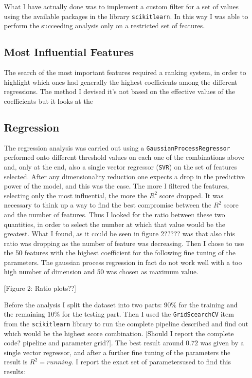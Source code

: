 \documentclass[11pt,a4paper]{report}
\begin{document}
What I have actually done was to implement a custom filter for a set of values using the available packages in the library \texttt{scikitlearn}. In this way I was able to perform the succeeding analysis only on a restricted set of features.

\subsection*{Most Influential Features}
The search of the most important features required a ranking system, in order to highlight which ones had generally the highest coefficients among the different regressions. The method I devised it's not based on the effective values of the coefficients but it looks at the 



\subsection*{Regression}
The regression analysis was carried out using a \texttt{GaussianProcessRegressor} performed onto different threshold values on each one of the combinations above and, only at the end, also a single vector regressor (\texttt{SVR}) on the set of features selected.
After any dimensionality reduction one expects a drop in the predictive power of the model, and this was the case. The more I filtered the features, selecting only the most influential, the more the $R^{2}$ score dropped. It was necessary to think up a way to find the best compromise between the $R^{2}$ score and the number of features. Thus I looked for the ratio between these two quantities, in order to select the number at which that value would be the greatest. What I found, as it could be seen in figure 2????? was that also this ratio was dropping as the number of feature was decreasing. Then I chose to use the 50 features with the highest coefficient for the following fine tuning of the parameters. The gaussian process regression in fact do not work well with a too high number of dimension and 50 was chosen as maximum value.


[Figure 2: Ratio plots??]


Before the analysis I split the dataset into two parts: 90\% for the training and the remaining 10\% for the testing part. Then I used the \texttt{GridScearchCV} item from the \texttt{scikitlearn} library to run the complete pipeline described and find out which would be the highest score combination. [Should I report the complete code? pipeline and parameter grid?]. The best result around $0.72$ was given by a single vector regressor, and after a further fine tuning of the parameters the result is $R^{2} = running$. I report the exact set of parametersused to find this results:
\end{document}
